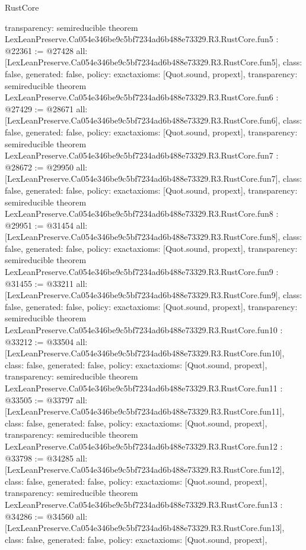 \begin{lexlean}{RustCore}
\begin{coremodule}
{  transparency: semireducible
}
theorem LexLeanPreserve.Ca054e346be9c5bf7234ad6b488e73329.R3.RustCore.fun5 : @22361 := @27428 {
  all: [LexLeanPreserve.Ca054e346be9c5bf7234ad6b488e73329.R3.RustCore.fun5],
  class: false,
  generated: false,
  policy: exact{axioms: [Quot.sound, propext]},
  transparency: semireducible
}
theorem LexLeanPreserve.Ca054e346be9c5bf7234ad6b488e73329.R3.RustCore.fun6 : @27429 := @28671 {
  all: [LexLeanPreserve.Ca054e346be9c5bf7234ad6b488e73329.R3.RustCore.fun6],
  class: false,
  generated: false,
  policy: exact{axioms: [Quot.sound, propext]},
  transparency: semireducible
}
theorem LexLeanPreserve.Ca054e346be9c5bf7234ad6b488e73329.R3.RustCore.fun7 : @28672 := @29950 {
  all: [LexLeanPreserve.Ca054e346be9c5bf7234ad6b488e73329.R3.RustCore.fun7],
  class: false,
  generated: false,
  policy: exact{axioms: [Quot.sound, propext]},
  transparency: semireducible
}
theorem LexLeanPreserve.Ca054e346be9c5bf7234ad6b488e73329.R3.RustCore.fun8 : @29951 := @31454 {
  all: [LexLeanPreserve.Ca054e346be9c5bf7234ad6b488e73329.R3.RustCore.fun8],
  class: false,
  generated: false,
  policy: exact{axioms: [Quot.sound, propext]},
  transparency: semireducible
}
theorem LexLeanPreserve.Ca054e346be9c5bf7234ad6b488e73329.R3.RustCore.fun9 : @31455 := @33211 {
  all: [LexLeanPreserve.Ca054e346be9c5bf7234ad6b488e73329.R3.RustCore.fun9],
  class: false,
  generated: false,
  policy: exact{axioms: [Quot.sound, propext]},
  transparency: semireducible
}
theorem LexLeanPreserve.Ca054e346be9c5bf7234ad6b488e73329.R3.RustCore.fun10 : @33212 := @33504 {
  all: [LexLeanPreserve.Ca054e346be9c5bf7234ad6b488e73329.R3.RustCore.fun10],
  class: false,
  generated: false,
  policy: exact{axioms: [Quot.sound, propext]},
  transparency: semireducible
}
theorem LexLeanPreserve.Ca054e346be9c5bf7234ad6b488e73329.R3.RustCore.fun11 : @33505 := @33797 {
  all: [LexLeanPreserve.Ca054e346be9c5bf7234ad6b488e73329.R3.RustCore.fun11],
  class: false,
  generated: false,
  policy: exact{axioms: [Quot.sound, propext]},
  transparency: semireducible
}
theorem LexLeanPreserve.Ca054e346be9c5bf7234ad6b488e73329.R3.RustCore.fun12 : @33798 := @34285 {
  all: [LexLeanPreserve.Ca054e346be9c5bf7234ad6b488e73329.R3.RustCore.fun12],
  class: false,
  generated: false,
  policy: exact{axioms: [Quot.sound, propext]},
  transparency: semireducible
}
theorem LexLeanPreserve.Ca054e346be9c5bf7234ad6b488e73329.R3.RustCore.fun13 : @34286 := @34560 {
  all: [LexLeanPreserve.Ca054e346be9c5bf7234ad6b488e73329.R3.RustCore.fun13],
  class: false,
  generated: false,
  policy: exact{axioms: [Quot.sound, propext]},
}
\end{coremodule}
\end{lexlean}
